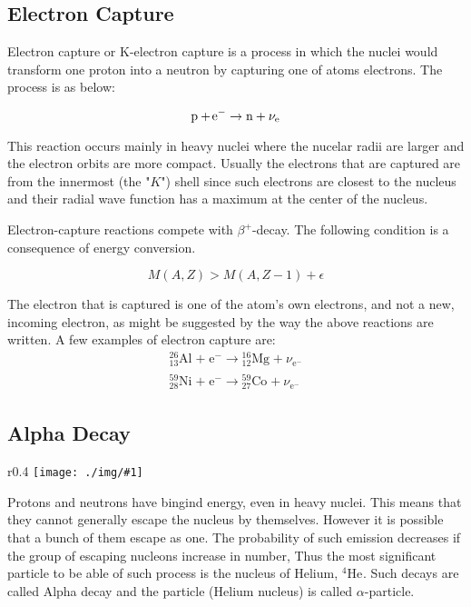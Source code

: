 \documentclass[10pt,a4paper]{article}
\newcounter{figurecounter}
\newcommand{\imgr}[3]{
    \begin{wrapfigure}{r}{#2\textwidth}
        \centering
        \captionsetup{justification=centering,margin=0cm,labelformat=empty}
        \texttt{[image: ./img/\#1]}
        \label{figure}
        \caption{\small \textbf{fig: \thefigurecounter} -- \textcolor{darkliver}{#3}}
    \end{wrapfigure}
    \addtocounter{figurecounter}{1}}
\newcommand{\ch}[5]{{}^{#2}_{#3}\!\text{#1}^{#4}_{#5}}
\newcommand{\electron}{\ch{e}{}{}{-}{}}
\begin{document}
\subsection{Electron Capture}
Electron capture or K-electron capture is a process in which the nuclei would transform one proton into a neutron by capturing one of atoms electrons. The process is as below:

\begin{equation}
    \text p +\ch{e}{}{}{-}{} \rightarrow \text n + \nu_{\text e}
\end{equation}

This reaction occurs mainly in heavy nuclei where the nucelar radii are larger and the electron orbits are more compact. Usually the electrons that are captured are from the innermost (the "$K$") shell since such electrons are closest to the nucleus and their radial wave function has a maximum at the center of the nucleus.

Electron-capture reactions compete with $\beta^+$-decay. The following condition is a consequence of energy conversion.

\begin{equation}
    M(A,Z) > M(A,Z-1) + \epsilon
\end{equation}

The electron that is captured is one of the atom's own electrons, and not a new, incoming electron, as might be suggested by the way the above reactions are written. A few examples of electron capture are:
\begin{align}
    \ch{Al}{26}{13}{}{} +\electron \rightarrow \ch{Mg}{16}{12}{}{} +\nu_{\electron}\\
    \ch{Ni}{59}{28}{}{} +\electron \rightarrow \ch{Co}{59}{27}{}{} + \nu_{\electron}
\end{align}


\subsection{Alpha Decay}
\imgr{wrefandtrans}{0.4}{Illustration of the tunnelling probability of a wave packet.}
Protons and neutrons have bingind energy, even in heavy nuclei. This means that they cannot generally escape the nucleus by themselves. However it is possible that a bunch of them escape as one. The probability of such emission decreases if the group of escaping nucleons increase in number, Thus the most significant particle to be able of such process is the nucleus of Helium, $\ch{He}{4}{}{}{}$. Such decays are called Alpha decay and the particle (Helium nucleus) is called $\alpha$-particle.
\end{document}
